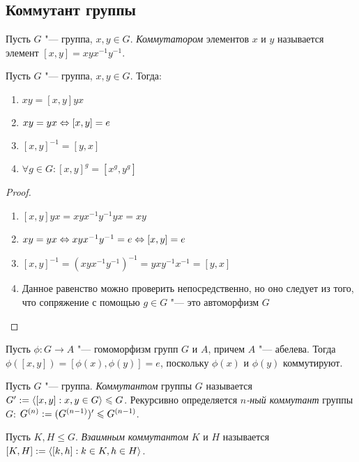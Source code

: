 \subsection{Коммутант группы}

\begin{definition}
	Пусть $G$ "--- группа, $x, y \in G$. \textit{Коммутатором} элементов $x$ и $y$ называется элемент $[x, y] = xyx^{-1}y^{-1}$.
\end{definition}

\begin{proposition} Пусть $G$ "--- группа, $x, y \in G$. Тогда:
	\begin{enumerate}
		\item $xy = [x, y]yx$
		\item $xy = yx \Leftrightarrow [x, y] = e$
		\item $[x, y]^{-1} = [y, x]$
		\item $\forall g \in G: [x, y]^g = [x^g, y^g]$ 
	\end{enumerate}
\end{proposition}

\begin{proof}~
	\begin{enumerate}
		\item $[x, y]yx = xyx^{-1}y^{-1}yx = xy$
		\item $xy = yx \Leftrightarrow xyx^{-1}y^{-1} = e \Leftrightarrow [x, y] = e$
		\item $[x, y]^{-1} = (xyx^{-1}y^{-1})^{-1} = yxy^{-1}x^{-1} = [y, x]$
		\item Данное равенство можно проверить непосредственно, но оно следует из того, что сопряжение с помощью $g \in G$ "--- это автоморфизм $G$
	\end{enumerate}
\end{proof}

\begin{note}
	Пусть $\phi : G \to A$ "--- гомоморфизм групп $G$ и $A$, причем $A$ "--- абелева. Тогда $\phi([x, y]) = [\phi(x), \phi(y)] = e$, поскольку $\phi(x)$ и $\phi(y)$ коммутируют.
\end{note}

\begin{definition}
	Пусть $G$ "--- группа. \textit{Коммутантом} группы $G$ называется $G' := \langle[x, y]: x, y \in G\rangle \leqslant G$. Рекурсивно определяется \textit{$n$-ный коммутант} группы $G$: $G^{(n)} := (G^{(n - 1)})' \hm\le G^{(n - 1)}$.
\end{definition}

\begin{definition}
	Пусть $K, H \le G$. \textit{Взаимным коммутантом} $K$ и $H$ называется $[K, H] := \langle[k, h]: k \in K,  h \in H\rangle$.
\end{definition}

